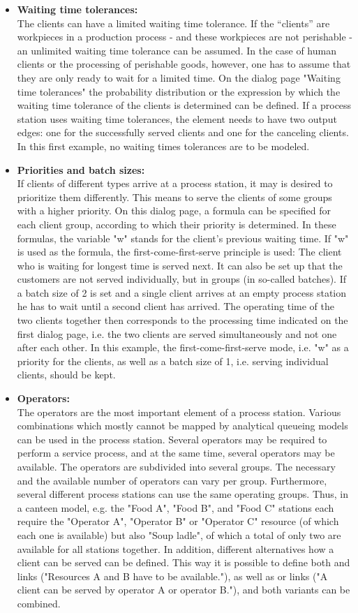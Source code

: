\documentclass{svmono}
\begin{document}
\begin{itemize}
\item
\textbf{Waiting time tolerances:}\\
The clients can have a limited waiting time tolerance. If the “clients” are workpieces in a production process - and these workpieces are not perishable - an unlimited waiting time tolerance can be assumed. In the case of human clients or the processing of perishable goods, however, one has to assume that they are only ready to wait for a limited time. On the dialog page "Waiting time tolerances" the probability distribution or the expression by which the waiting time tolerance of the clients is determined can be defined. If a process station uses waiting time tolerances, the element needs to have two output edges: one for the successfully served clients and one for the canceling clients. In this first example, no waiting times tolerances are to be modeled.
\item
\textbf{Priorities and batch sizes:}\\
If clients of different types arrive at a process station, it may is desired to prioritize them differently. This means to serve the clients of some groups with a higher priority. On this dialog page, a formula can be specified for each client group, according to which their priority is determined. In these formulas, the variable "w" stands for the client's previous waiting time. If "w" is used as the formula, the first-come-first-serve principle is used: The client who is waiting for longest time is served next. It can also be set up that the customers are not served individually, but in groups (in so-called batches). If a batch size of 2 is set and a single client arrives at an empty process station he has to wait until a second client has arrived. The operating time of the two clients together then corresponds to the processing time indicated on the first dialog page, i.e. the two clients are served simultaneously and not one after each other. In this example, the first-come-first-serve mode, i.e. "w" as a priority for the clients, as well as a batch size of 1, i.e. serving individual clients, should be kept.
\item
\textbf{Operators:}\\
The operators are the most important element of a process station. Various combinations which mostly cannot be mapped by analytical queueing models can be used in the process station. Several operators may be required to perform a service process, and at the same time, several operators may be available. The operators are subdivided into several groups. The necessary and the available number of operators can vary per group. Furthermore, several different process stations can use the same operating groups. Thus, in a canteen model, e.g. the "Food A", "Food B", and "Food C" stations each require the "Operator A", "Operator B" or "Operator C" resource (of which each one is available) but also "Soup ladle", of which a total of only two are available for all stations together. In addition, different alternatives how a client can be served can be defined. This way it is possible to define both and links ("Resources A and B have to be available."), as well as or links ("A client can be served by operator A or operator B."), and both variants can be combined.


\end{itemize}
\end{document}
